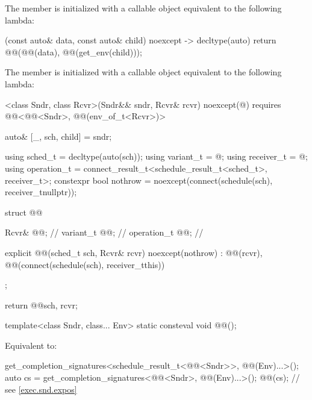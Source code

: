 \pnum
The member 
is initialized with a callable object equivalent to the following lambda:
\begin{codeblock}
[](const auto& data, const auto& child) noexcept -> decltype(auto) {
  return @@(@@(data), @@(get_env(child)));
}
\end{codeblock}

\pnum
The member 
is initialized with a callable object equivalent to the following lambda:
\begin{codeblock}
[]<class Sndr, class Rcvr>(Sndr&& sndr, Rcvr& rcvr) noexcept(@\seebelow@)
    requires @@<@@<Sndr>, @@(env_of_t<Rcvr>)> {

  auto& [_, sch, child] = sndr;

  using sched_t = decltype(auto(sch));
  using variant_t = @\seebelow@;
  using receiver_t = @\seebelow@;
  using operation_t = connect_result_t<schedule_result_t<sched_t>, receiver_t>;
  constexpr bool nothrow = noexcept(connect(schedule(sch), receiver_t{nullptr}));

  struct @@ {
    Rcvr& @@;                 // \expos
    variant_t @@;     // \expos
    operation_t @@;       // \expos

    explicit @@(sched_t sch, Rcvr& rcvr) noexcept(nothrow)
      : @@(rcvr), @@(connect(schedule(sch), receiver_t{this})) {}
  };

  return @@{sch, rcvr};
}
\end{codeblock}

\begin{itemdecl}
template<class Sndr, class... Env>
  static consteval void @@();
\end{itemdecl}

\begin{itemdescr}
\pnum
\effects
Equivalent to:
\begin{codeblock}
get_completion_signatures<schedule_result_t<@@<Sndr>>, @@(Env)...>();
auto cs = get_completion_signatures<@@<Sndr>, @@(Env)...>();
@@(cs);   // see \ref{exec.snd.expos}
\end{codeblock}
\end{itemdescr}


